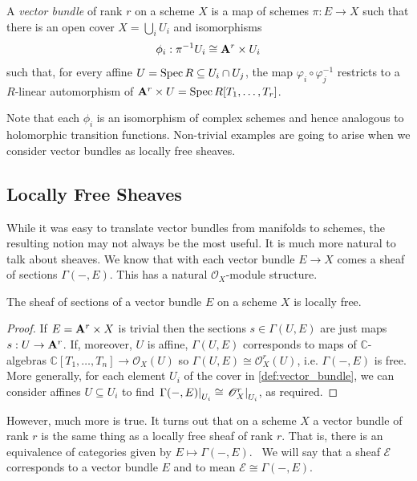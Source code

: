 \documentclass[12pt]{ociamthesis}  %
\begin{document}
\begin{definition}
  \label{def:vector_bundle}
  A \emph{vector bundle} of rank $r$ on a scheme $X$ is
  a map of schemes $\pi : E \to X$ such that there is an open
  cover $X = \bigcup_i U_i$ and isomorphisms
  \begin{align}\label{eq:trivialisation}
    \phi_i : {\pi}^{-1}U_i \cong \mathbf{A}^{r}_{}\times U_i
  \end{align}
  such that, for every affine $U = \operatorname{Spec} R \subseteq U_i \cap U_j$,
  the map $\varphi_i \circ \varphi^{-1}_j$ restricts to a $R$-linear
  automorphism of $\mathbf{A}^{r}_{}\times U = \operatorname{Spec} R[T_1,\ldots,T_r]$.
\end{definition}

Note that each $\phi_i$ is an isomorphism of complex schemes
and hence analogous to holomorphic transition functions.
Non-trivial examples are going to arise when we consider vector bundles
as locally free sheaves.

\subsection{Locally Free Sheaves}\label{sec:locally_free_sheaves}

While it was easy to translate vector bundles from manifolds
to schemes, the resulting notion may not always be the most
useful. It is much more natural to talk about sheaves. We know
that with each vector bundle $E\to X$ comes a sheaf of sections
$\Gamma(-,E)$. This has a natural $\mathscr O_X$-module structure.

\begin{lemma}
  The sheaf of sections of a vector bundle $E$ on a scheme $X$ is
  locally free.
  \begin{proof}
    If $E=\mathbf{A}^{r}_{}\times X$ is
    trivial then the sections $s\in\Gamma(U,E)$ are just maps
    $s:U\to \mathbf{A}^{r}_{}$. If, moreover, $U$ is affine,
    $\Gamma(U,E)$ corresponds to maps of
    $\mathbb{C}$-algebras
    $\mathbb{C}[T_1,\ldots,T_n]\to\mathscr O_X(U)$ so
    $\Gamma(U,E)\cong \mathscr O^r_X(U)$, i.e. $\Gamma(-,E)$
    is free.
    More generally, for each element $U_i$ of the cover in
    \ref{def:vector_bundle}, we can consider affines $U\subseteq U_i$
    to find $\left.{\Gamma(-,E)}\right\vert_{U_i}\cong \left.{\mathscr O_X^r}\right\vert_{U_i}$,
    as required.
  \end{proof}
\end{lemma}

However, much more is true. It turns out that on a scheme $X$
a vector bundle of rank $r$ is the same thing as a locally
free sheaf of rank $r$. That is, there is an equivalence
of categories given by $E \mapsto \Gamma(-,E)$.~\cite[128-129]{hartshorne1977}
We will say that a sheaf $\mathscr E$ corresponds to a vector bundle
$E$ and to mean $\mathscr E\cong\Gamma(-,E)$.
\end{document}
